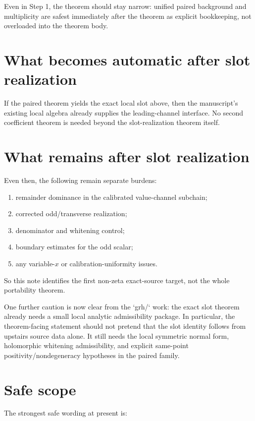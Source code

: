 \documentclass[11pt]{article}
\begin{document}
Even in Step 1, the theorem should stay narrow: unified paired background and
multiplicity are safest immediately after the theorem as explicit bookkeeping,
not overloaded into the theorem body.

\section{What becomes automatic after slot realization}

If the paired theorem yields the exact local slot above, then the manuscript's
existing local algebra already supplies the leading-channel interface. No second
coefficient theorem is needed beyond the slot-realization theorem itself.

\section{What remains after slot realization}

Even then, the following remain separate burdens:

\begin{enumerate}
\item remainder dominance in the calibrated value-channel subchain;
\item corrected odd/transverse realization;
\item denominator and whitening control;
\item boundary estimates for the odd scalar;
\item any variable-\(x\) or calibration-uniformity issues.
\end{enumerate}

So this note identifies the first non-zeta exact-source target, not the whole
portability theorem.

One further caution is now clear from the `grh/` work: the exact slot theorem
already needs a small local analytic admissibility package. In particular, the
theorem-facing statement should not pretend that the slot identity follows from
upstairs source data alone. It still needs the local symmetric normal form,
holomorphic whitening admissibility, and explicit same-point
positivity/nondegeneracy hypotheses in the paired family.

\section{Safe scope}

The strongest safe wording at present is:
\end{document}
